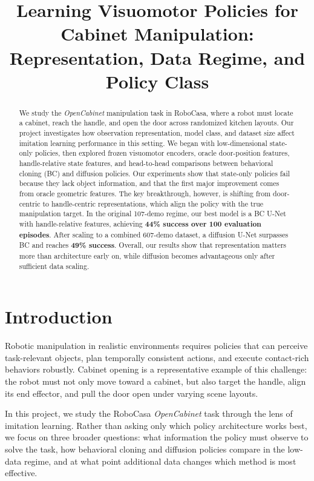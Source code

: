 \documentclass[10pt,conference]{IEEEtran}
\title{Learning Visuomotor Policies for Cabinet Manipulation:\\
Representation, Data Regime, and Policy Class}
\author{
\IEEEauthorblockN{Satyajit Kumar \and Noah Cylich}
}
\newcommand{\best}[1]{\textbf{#1}}
\begin{document}
\maketitle

\begin{abstract}
We study the \textit{OpenCabinet} manipulation task in RoboCasa, where a robot must locate a cabinet, reach the handle, and open the door across randomized kitchen layouts. Our project investigates how observation representation, model class, and dataset size affect imitation learning performance in this setting. We began with low-dimensional state-only policies, then explored frozen visuomotor encoders, oracle door-position features, handle-relative state features, and head-to-head comparisons between behavioral cloning (BC) and diffusion policies. Our experiments show that state-only policies fail because they lack object information, and that the first major improvement comes from oracle geometric features. The key breakthrough, however, is shifting from door-centric to handle-centric representations, which align the policy with the true manipulation target. In the original 107-demo regime, our best model is a BC U-Net with handle-relative features, achieving \best{44\% success over 100 evaluation episodes}. After scaling to a combined 607-demo dataset, a diffusion U-Net surpasses BC and reaches \best{49\% success}. Overall, our results show that representation matters more than architecture early on, while diffusion becomes advantageous only after sufficient data scaling.
\end{abstract}

\section{Introduction}
Robotic manipulation in realistic environments requires policies that can perceive task-relevant objects, plan temporally consistent actions, and execute contact-rich behaviors robustly. Cabinet opening is a representative example of this challenge: the robot must not only move toward a cabinet, but also target the handle, align its end effector, and pull the door open under varying scene layouts.

In this project, we study the RoboCasa \textit{OpenCabinet} task through the lens of imitation learning. Rather than asking only which policy architecture works best, we focus on three broader questions: what information the policy must observe to solve the task, how behavioral cloning and diffusion policies compare in the low-data regime, and at what point additional data changes which method is most effective.
\end{document}
